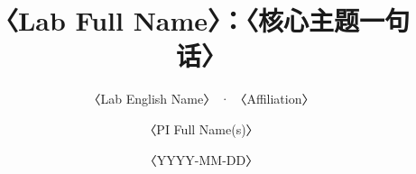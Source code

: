 %
%
\documentclass[aspectratio=1610,10pt]{ctexbeamer}


\usepackage{amssymb}
\usepackage{tikz}
\graphicspath{{figures/}}

\newcommand{\ph}[1]{\textcolor{sustechgrey}{〈#1〉}}
\newcommand{\phfig}{%
  \fcolorbox{cardgrey}{bgsoft}{%
    \parbox[c][0.42\textheight][c]{0.96\linewidth}{\centering
      \color{sustechgrey}（图片占位 \textbar\ \texttt{\textbackslash fitfigure\{...\}}）}}}
\newcommand{\con}[1]{\textcolor{sustechgrey}{#1}}

\title[〈Lab Short Name〉 实验室调研]{〈Lab Full Name〉：〈核心主题一句话〉}
\subtitle{〈Lab English Name〉 · 〈Affiliation〉}
\author[〈PI et al.〉]{〈PI Full Name(s)〉}
\date{〈YYYY-MM-DD〉}



